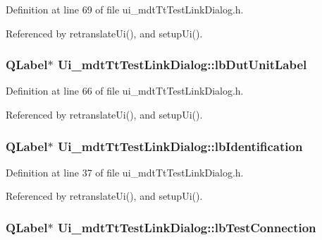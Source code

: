 Definition at line 69 of file ui\-\_\-mdt\-Tt\-Test\-Link\-Dialog.\-h.



Referenced by retranslate\-Ui(), and setup\-Ui().

\hypertarget{class_ui__mdt_tt_test_link_dialog_a68b1a69da30ed13839fc51c40114a2da}{
\subsubsection[{lb\-Dut\-Unit\-Label}]{\setlength{\rightskip}{0pt plus 5cm}Q\-Label$\ast$ Ui\-\_\-mdt\-Tt\-Test\-Link\-Dialog\-::lb\-Dut\-Unit\-Label}}\label{class_ui__mdt_tt_test_link_dialog_a68b1a69da30ed13839fc51c40114a2da}


Definition at line 66 of file ui\-\_\-mdt\-Tt\-Test\-Link\-Dialog.\-h.



Referenced by retranslate\-Ui(), and setup\-Ui().

\hypertarget{class_ui__mdt_tt_test_link_dialog_a1817535e94682d5d6e590169ad18feaf}{
\subsubsection[{lb\-Identification}]{\setlength{\rightskip}{0pt plus 5cm}Q\-Label$\ast$ Ui\-\_\-mdt\-Tt\-Test\-Link\-Dialog\-::lb\-Identification}}\label{class_ui__mdt_tt_test_link_dialog_a1817535e94682d5d6e590169ad18feaf}


Definition at line 37 of file ui\-\_\-mdt\-Tt\-Test\-Link\-Dialog.\-h.



Referenced by retranslate\-Ui(), and setup\-Ui().

\hypertarget{class_ui__mdt_tt_test_link_dialog_a140948071c242ac25391269da9553a27}{
\subsubsection[{lb\-Test\-Connection}]{\setlength{\rightskip}{0pt plus 5cm}Q\-Label$\ast$ Ui\-\_\-mdt\-Tt\-Test\-Link\-Dialog\-::lb\-Test\-Connection}}\label{class_ui__mdt_tt_test_link_dialog_a140948071c242ac25391269da9553a27}


